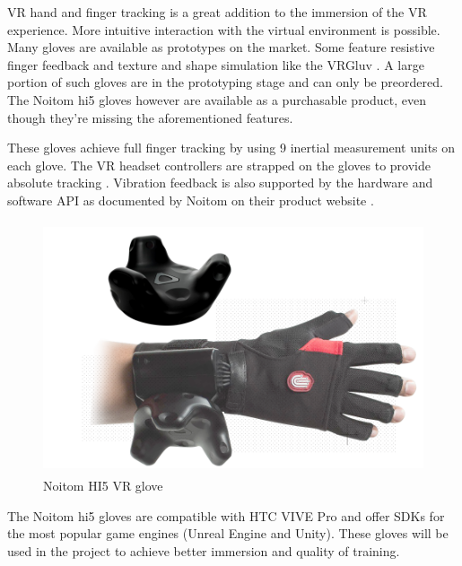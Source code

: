 \documentclass[12pt, a4paper,oneside, nocenter]{thesis}
\begin{document}
VR hand and finger tracking is a great addition to the immersion of the VR experience. More intuitive interaction with the virtual environment is possible. Many gloves are available as prototypes on the market. Some feature resistive finger feedback and texture and shape simulation like the VRGluv \citeyearpar{vrgluv}. A large portion of such gloves are in the prototyping stage and can only be preordered. The Noitom hi5 gloves however are available as a purchasable product, even though they're missing the aforementioned features.
\par
These gloves achieve full finger tracking by using 9 inertial measurement units on each glove. The VR headset controllers are strapped on the gloves to provide absolute tracking . Vibration feedback is also supported by the hardware and software API as documented by Noitom on their product website \citeyearpar{hi5-vr-glove}.
\begin{figure}[H]
	\includegraphics[height=210pt]{vr-glove2}
	\caption{Noitom HI5 VR glove \citeyearpar{hi5-vr-glove}}
	\label{fig:vr-glove}
\end{figure}
\par
The Noitom hi5 gloves are compatible with HTC VIVE Pro and offer SDKs for the most popular game engines (Unreal Engine and Unity). These gloves will be used in the project to achieve better immersion and quality of training.
\end{document}
